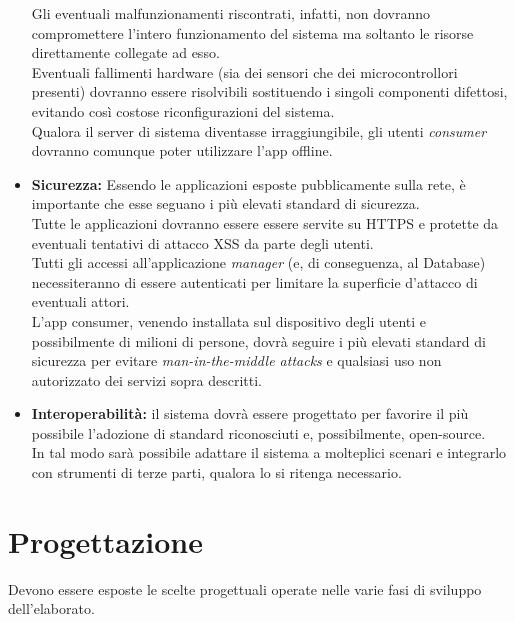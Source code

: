 \documentclass[12pt]{article}
\begin{document}
\begin{itemize}
Gli eventuali malfunzionamenti riscontrati, infatti, non dovranno compromettere l'intero funzionamento del sistema ma soltanto le risorse direttamente collegate ad esso.\\ 
Eventuali fallimenti hardware (sia dei sensori che dei microcontrollori presenti) dovranno essere risolvibili sostituendo i singoli componenti difettosi, evitando così costose riconfigurazioni del sistema.\\
Qualora il server di sistema diventasse irraggiungibile, gli utenti \textit{consumer} dovranno comunque poter utilizzare l'app offline.

\item \textbf{Sicurezza:} Essendo le applicazioni esposte pubblicamente sulla rete, è importante che esse seguano i più elevati standard di sicurezza.\\
Tutte le applicazioni dovranno essere essere servite su HTTPS e protette da eventuali tentativi di attacco XSS da parte degli utenti.\\
Tutti gli accessi all'applicazione \textit{manager} (e, di conseguenza, al Database) necessiteranno di essere autenticati per limitare la superficie d'attacco di eventuali attori.\\
L'app consumer, venendo installata sul dispositivo degli utenti e possibilmente di milioni di persone, dovrà seguire i più elevati standard di sicurezza per evitare \textit{man-in-the-middle attacks} e qualsiasi uso non autorizzato dei servizi sopra descritti.

\item \textbf{Interoperabilità:} il sistema dovrà essere progettato per favorire il più possibile l'adozione di standard riconosciuti e, possibilmente, open-source.\\
In tal modo sarà possibile adattare il sistema a molteplici scenari e integrarlo con strumenti di terze parti, qualora lo si ritenga necessario.
\end{itemize}
\newpage
\section{Progettazione}

Devono essere esposte le scelte progettuali operate nelle varie fasi di sviluppo dell'elaborato.\\
\end{document}
